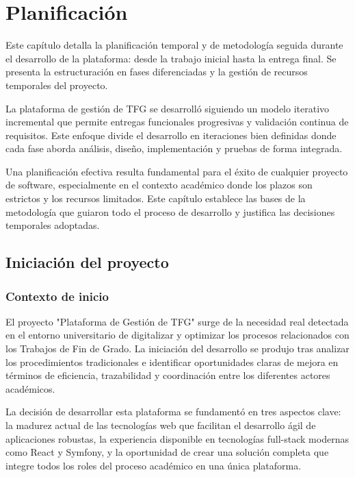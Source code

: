 \documentclass[12pt,a4paper,oneside]{report}
\begin{document}
\chapter{Planificación}\label{planificaciuxf3n}
Este capítulo detalla la planificación temporal y de metodología seguida durante el desarrollo de la plataforma: desde la trabajo inicial hasta la entrega final. Se presenta la estructuración en fases diferenciadas y la gestión de recursos temporales del proyecto.

La plataforma de gestión de TFG se desarrolló siguiendo un modelo iterativo incremental que permite entregas funcionales progresivas y validación continua de requisitos. Este enfoque divide el desarrollo en iteraciones bien definidas donde cada fase aborda análisis, diseño, implementación y pruebas de forma integrada.

Una planificación efectiva resulta fundamental para el éxito de cualquier proyecto de software, especialmente en el contexto académico donde los plazos son estrictos y los recursos limitados. Este capítulo establece las bases de la metodología que guiaron todo el proceso de desarrollo y justifica las decisiones temporales adoptadas.

\section{Iniciación del proyecto}\label{iniciaciuxf3n-del-proyecto}

\subsection{Contexto de inicio}\label{contexto-de-inicio}

El proyecto "Plataforma de Gestión de TFG" surge de la necesidad real detectada en el entorno universitario de digitalizar y optimizar los procesos relacionados con los Trabajos de Fin de Grado. La iniciación del desarrollo se produjo tras analizar los procedimientos tradicionales e identificar oportunidades claras de mejora en términos de eficiencia, trazabilidad y coordinación entre los diferentes actores académicos.

La decisión de desarrollar esta plataforma se fundamentó en tres aspectos clave: la madurez actual de las tecnologías web que facilitan el desarrollo ágil de aplicaciones robustas, la experiencia disponible en tecnologías full-stack modernas como React y Symfony, y la oportunidad de crear una solución completa que integre todos los roles del proceso académico en una única plataforma.
\end{document}
